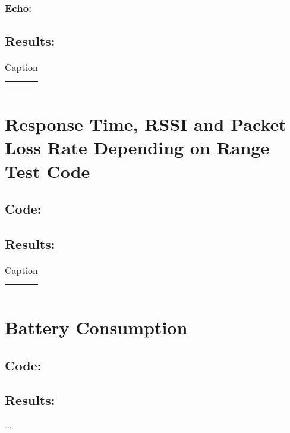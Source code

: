 \subsubsection*{Echo:}

\subsection*{Results:}
\begin{table}[H]
    \centering
    \begin{tabular}{c|c}
         &  \\
         & 
    \end{tabular}
    \vspace{\ftspace}
    \caption{Caption}
    \label{tab:apx:ping_results}
\end{table}

\section*{Response Time, RSSI and Packet Loss Rate Depending on Range Test Code}
\subsection*{Code:}

\subsection*{Results:}
\begin{table}[H]
    \centering
    \begin{tabular}{c|c}
         &  \\
         & 
    \end{tabular}
    \vspace{\ftspace}
    \caption{Caption}
    \label{tab:apx:rssi_results}
\end{table}

\section*{Battery Consumption}
\subsection*{Code:}

\subsection*{Results:}
...